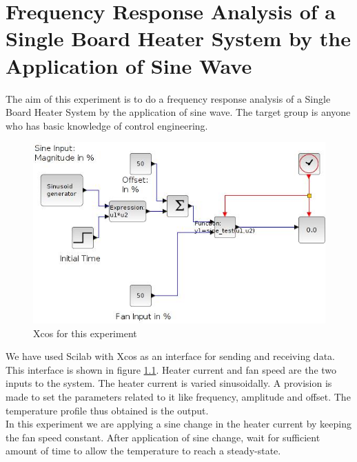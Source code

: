 \chapter{Frequency Response Analysis of a Single Board Heater System by the Application of Sine Wave}
The aim of this experiment is to do a frequency response analysis of a Single Board Heater System by the 
application of sine wave. The target group is anyone who has basic knowledge of control engineering.\\
\begin{figure}
\centering
\includegraphics[width=\linewidth]{sinetest_manual/sine_test.jpg}
\caption{Xcos for this experiment}
\label{xcos_sine}
\end{figure}
We have used Scilab with Xcos as an interface for sending and receiving data. 
This interface is shown in figure \ref{xcos_sine}. Heater current and fan speed are the two inputs to the system. 
The heater current is varied sinusoidally. A provision is made to set the parameters related to it like frequency, amplitude 
and offset. The temperature profile thus obtained is the output.\\
In this experiment we are applying a sine change in the heater current by keeping the fan speed constant. 
After application of sine change, wait for sufficient amount of time to allow the temperature to reach a steady-state.
